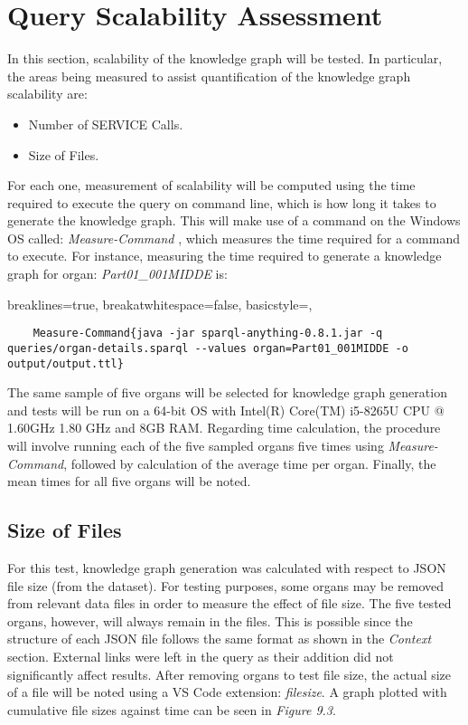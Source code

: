 \section{Query Scalability Assessment}
In this section, scalability of the knowledge graph will be tested. In particular, the areas being measured to assist quantification of the knowledge graph scalability are: 

\vspace{-0.1cm}
\begin{itemize}
\itemsep0cm
    \item Number of SERVICE Calls.
    \vspace{-0.1cm}
    \item Size of Files.
\end{itemize}
\vspace{-0.1cm}

For each one, measurement of scalability will be computed using the time required to execute the query on command line, which is how long it takes to generate the knowledge graph. This will make use of a command on the Windows OS called: \textit{Measure-Command} \cite{measurecommand}, which measures the time required for a command to execute. For instance, measuring the time required to generate a knowledge graph for organ: \textit{Part01\_001MIDDE} is:

\lstset
{
    breaklines=true,
    breakatwhitespace=false,
    basicstyle=\ttfamily,
}
\begin{lstlisting}
    Measure-Command{java -jar sparql-anything-0.8.1.jar -q queries/organ-details.sparql --values organ=Part01_001MIDDE -o output/output.ttl}
\end{lstlisting}

The same sample of five organs will be selected for knowledge graph generation and tests will be run on a 64-bit OS with Intel(R) Core(TM) i5-8265U CPU @ 1.60GHz 1.80 GHz and 8GB RAM. Regarding time calculation, the procedure will involve running each of the five sampled organs five times using \textit{Measure-Command}, followed by calculation of the average time per organ. Finally, the mean times for all five organs will be noted.

\subsection{Size of Files}
\hspace{0.5cm} For this test, knowledge graph generation was calculated with respect to JSON file size (from the dataset). For testing purposes, some organs may be removed from relevant data files in order to measure the effect of file size. The five tested organs, however, will always remain in the files. This is possible since the structure of each JSON file follows the same format as shown in the \textit{Context} section. External links were left in the query as their addition did not significantly affect results. After removing organs to test file size, the actual size of a file will be noted using a VS Code extension: \textit{filesize}. A graph plotted with cumulative file sizes against time can be seen in \textit{Figure 9.3}.

